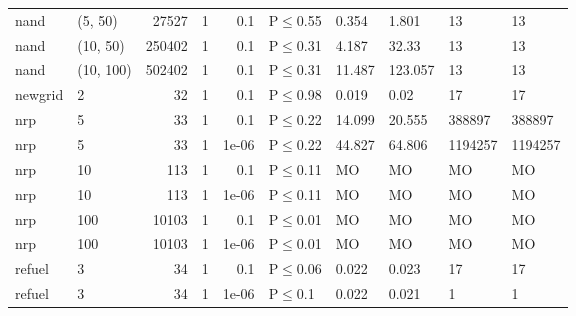 \begin{longtable}{llrrrlllll}
 nand          & (5, 50)   &  	27527 & 1 & 0.1   & P$\leq$0.55  & 0.354  & 1.801   & 13      & 13      \\
 nand          & (10, 50)  & 	250402 & 1 & 0.1   & P$\leq$0.31  & 4.187  & 32.33   & 13      & 13      \\
 nand          & (10, 100) & 	502402 & 1 & 0.1   & P$\leq$0.31  & 11.487 & 123.057 & 13      & 13      \\
 newgrid       & 2         &     	32 & 1 & 0.1   & P$\leq$0.98  & 0.019  & 0.02    & 17      & 17      \\
 nrp           & 5         &     	33 & 1 & 0.1   & P$\leq$0.22  & 14.099 & 20.555  & 388897  & 388897  \\
 nrp           & 5         &     	33 & 1 & 1e-06 & P$\leq$0.22  & 44.827 & 64.806  & 1194257 & 1194257 \\
 nrp           & 10        &    	113 & 1 & 0.1   & P$\leq$0.11  & MO     & MO      & MO      & MO      \\
 nrp           & 10        &    	113 & 1 & 1e-06 & P$\leq$0.11  & MO     & MO      & MO      & MO      \\
 nrp           & 100       &  	10103 & 1 & 0.1   & P$\leq$0.01  & MO     & MO      & MO      & MO      \\
 nrp           & 100       &  	10103 & 1 & 1e-06 & P$\leq$0.01  & MO     & MO      & MO      & MO      \\
 refuel        & 3         &     	34 & 1 & 0.1   & P$\leq$0.06  & 0.022  & 0.023   & 17      & 17      \\
 refuel        & 3         &     	34 & 1 & 1e-06 & P$\leq$0.1   & 0.022  & 0.021   & 1       & 1       \\
\bottomrule
\end{longtable}
